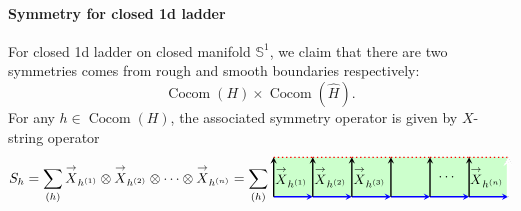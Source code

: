 \documentclass[a4paper,11pt]{article}
\theoremstyle{theorem}
\theoremstyle{remark}
\newcommand{\XR}{\overset{\rightarrow}{X}}
\newcommand{\cone}{(1)}
\newcommand{\ctwo}{(2)}
\newcommand{\cthree}{(3)}
\newcommand{\Cocom}{\operatorname{Cocom}}
\begin{document}
\paragraph{Symmetry for closed 1d ladder}
For closed 1d ladder on closed manifold $\mathbb{S}^1$, we claim that there are two symmetries comes from rough and smooth boundaries respectively:
\begin{equation}
    \Cocom(H) \times \Cocom(\hat{H}).
\end{equation}
For any $h \in \Cocom(H)$, the associated symmetry operator is given by $X$-string operator
\begin{equation}
    S_h = \sum_{(h)}\XR_{h^{\cone}} \otimes \XR_{h^{\ctwo}} \otimes \cdots \otimes \XR_{h^{(n)}} \\
    = \sum_{(h)}
    \begin{aligned}
\begin{tikzpicture}
    \def\n{5}
    \def\s{1}
    \fill[green!20] (0, 0) rectangle (\n*\s+\s, \s); %
    \foreach \i in {0,...,\n} {
        \draw[-stealth, line width=1.0pt,blue, midway] (\i*\s, 0) -- (\i*\s+\s, 0);
        \draw[dotted, line width=1.0pt,red, midway] (\i*\s, \s) -- (\i*\s+\s, \s);
        \draw[-stealth,line width=1.0pt, midway] (\i*\s, 0) -- (\i*\s, \s);
    }
    \draw[-stealth, midway,line width=1.0pt] (\n*\s+\s, 0) -- (\n*\s+\s, \s);
    \node[ line width=0.2pt, dashed, draw opacity=0.5] (a) at (.45,0.5){$\XR_{h^{\cone}}$};
    \node[ line width=0.2pt, dashed, draw opacity=0.5] (a) at (1.45,0.5){$\XR_{h^{\ctwo}}$};
    \node[ line width=0.2pt, dashed, draw opacity=0.5] (a) at (2.45,0.5){$\XR_{h^{\cthree}}$};
        \node[ line width=0.2pt, dashed, draw opacity=0.5] (a) at (4.45,0.5){$\cdots$};
     \node[ line width=0.2pt, dashed, draw opacity=0.5] (a) at (5.45,0.5){$\XR_{h^{(n)}}$};
      \draw[-stealth, white, line width=2pt, midway] (6, 0) -- (6, 1.02);
\end{tikzpicture}
\end{aligned}
\end{equation}
\end{document}
